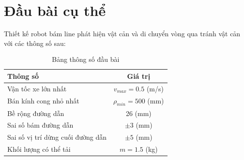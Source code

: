     \section{Đầu bài cụ thể}
        \hspace*{0.6cm}Thiết kế robot bám line phát hiện vật cản và di chuyển vòng qua tránh vật cản với
        các thông số sau:
        \begin{table}[h]
            \centering
            \caption{Bảng thông số đầu bài}
            \begin{tabular}{|l|c|}
            \hline
            \centering \textbf{Thông số} & \textbf{Giá trị} \\
            \hline
            Vận tốc xe lớn nhất & $v_{max} = 0.5$ (m/s) \\
            \hline
            Bán kính cong nhỏ nhất & $\rho_{min} = 500$ (mm) \\
            \hline
            Bề rộng đường dẫn & 26 (mm) \\
            \hline
            Sai số bám đường dẫn & $\pm 3$ (mm) \\
            \hline
            Sai số vị trí dừng cuối đường dẫn & $\pm 5$ (mm) \\
            \hline
            Khối lượng có thể tải & $m = 1.5$ (kg) \\
            \hline
            \end{tabular}
        \end{table}





    